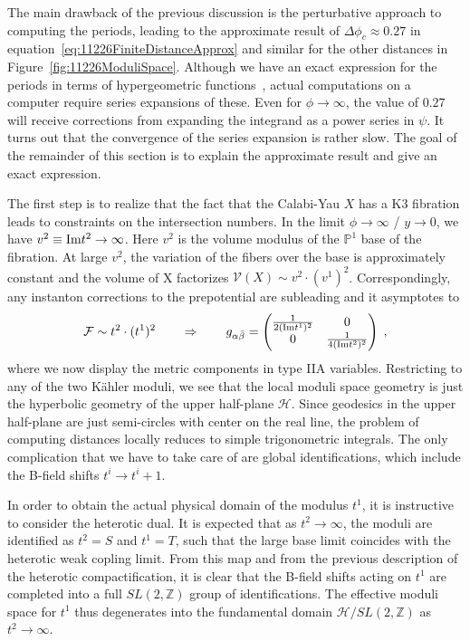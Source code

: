 \documentclass[11pt,a4paper]{article}
\numberwithin{equation}{section}
\numberwithin{table}{section}\setlength{\multlinegap}{25pt}
\begin{document}
The main drawback of the previous discussion is the perturbative approach to computing the periods, leading to the approximate result of $\Delta\phi_c\approx 0.27$ in equation~\eqref{eq:11226FiniteDistanceApprox} and similar for the other distances in Figure~\ref{fig:11226ModuliSpace}. Although we have an exact expression for the periods in terms of hypergeometric functions~\cite{Blumenhagen:2018nts}, actual computations on a computer require series expansions of these. Even for $\phi\to\infty$, the value of $0.27$ will receive corrections from expanding the integrand as a power series in $\psi$. It turns out that the convergence of the series expansion is rather slow. The goal of the remainder of this section is to explain the approximate result and give an exact expression.

The first step is to realize that the fact that the Calabi-Yau $X$ has a K3 fibration leads to constraints on the intersection numbers. In the limit $\phi\to\infty$ / $y\to 0$, we have $v^2\equiv\textup{Im} t^2\to \infty$. Here $v^2$ is the volume modulus of the $\mathbb{P}^1$ base of the fibration. At large $v^2$, the variation of the fibers over the base is approximately constant and the volume of X factorizes $\mathcal{V}(X)\sim v^2\cdot (v^1)^2$. Correspondingly, any instanton corrections to the prepotential are subleading and it asymptotes to
\begin{equation}
    \label{eq:K3FibrationAsymptoticModuliMetric}
    \mathcal{F}\sim t^2\cdot (t^1)^2\qquad\Rightarrow\qquad g_{\alpha\bar{\beta}}
    =\begin{pmatrix}
        \frac{1}{2 (\textup{Im}t^1)^2}& 0\\
        0& \frac{1}{4 (\textup{Im}t^2)^2}\\
    \end{pmatrix}\;,
\end{equation}
where we now display the metric components in type IIA variables. Restricting to any of the two Kähler moduli, we see that the local moduli space geometry is just the hyperbolic geometry of the upper half-plane $\mathcal{H}$. Since geodesics in the upper half-plane are just semi-circles with center on the real line, the problem of computing distances locally reduces to simple trigonometric integrals. The only complication that we have to take care of are global identifications, which include the B-field shifts $t^i\to t^i+1$.

In order to obtain the actual physical domain of the modulus $t^1$, it is instructive to consider the heterotic dual. It is expected that as $t^2\to\infty$, the moduli are identified as $t^2=S$ and $t^1=T$, such that the large base limit coincides with the heterotic weak copling limit. From this map and from the previous description of the heterotic compactification, it is clear that the B-field shifts acting on $t^1$ are completed into a full $SL(2,\mathbb{Z})$ group of identifications. The effective moduli space for $t^1$ thus degenerates into the fundamental domain $\mathcal{H}/SL(2,\mathbb{Z})$ as $t^2\to\infty$.
\end{document}
